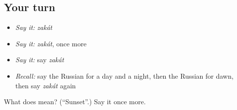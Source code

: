 \subsection*{Your turn}
\begin{itemize}
\raggedright
  \item \emph{Say it:} \emph{zakát}
  \item \emph{Say it:} \emph{zakát}, once more
  \item \emph{Say it:} say \emph{zakát}
  \item \emph{Recall:} say the Russian for a day and a night, then the Russian for dawn, then say \emph{zakát} again
\end{itemize}

\begin{tcolorbox}[breakable,colback=teal!4,colframe=teal!35!black,title={Before you move on}]
What does  mean? (\textquotedblleft{}Sunset\textquotedblright{}.) Say it once more.
\end{tcolorbox}
